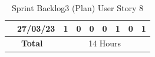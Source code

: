 \documentclass[12pt]{report}
\begin{document}
\begin{table}[h]
{\begin{tabular}{|cc|ccccccc|}
\rowcolor[HTML]{FFFFFF} 
\multicolumn{1}{|c|}{\cellcolor[HTML]{FFFFFF}\textbf{Testing}}                                                   & 27/03/23                                                           & \multicolumn{1}{c|}{\cellcolor[HTML]{FFFFFF}1}                                                                    & \multicolumn{1}{c|}{\cellcolor[HTML]{FFFFFF}0}                                                                  & \multicolumn{1}{c|}{\cellcolor[HTML]{FFFFFF}0}                                                                  & \multicolumn{1}{c|}{\cellcolor[HTML]{FFFFFF}0}                                                                  & \multicolumn{1}{c|}{\cellcolor[HTML]{FFFFFF}1}                                                                  & \multicolumn{1}{c|}{\cellcolor[HTML]{FFFFFF}0}                                                                  & \cellcolor[HTML]{FFFFFF}1                                                                  \\ \hline
\multicolumn{2}{|c|}{\textbf{Total}}                                                                                                                                                  & \multicolumn{7}{c|}{14   Hours}                                                                                                                                                                                                                                                                                                                                                                                                                                                                                                                                                                                                                                                                                                                                                                          \\ \hline
\end{tabular}
}
\caption{Sprint Backlog3 (Plan) User Story 8}
\label{tab:mytable}
\end{table}
\end{document}
